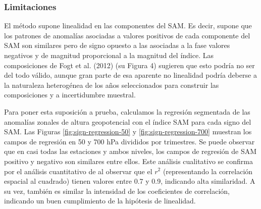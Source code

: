 \documentclass[12pt,oneside]{reedthesis}
\begin{document}
\hypertarget{limitaciones}{%
\subsubsection{Limitaciones}\label{limitaciones}}

El método supone linealidad en las componentes del SAM.
Es decir, supone que los patrones de anomalías asociadas a valores positivos de cada componente del SAM son similares pero de signo opuesto a las asociadas a la fase valores negativos y de magnitud proporcional a la magnitud del índice.
Las composiciones de Fogt et al. (2012) (su Figura 4) sugieren que esto podría no ser del todo válido, aunque gran parte de esa aparente no linealidad podría deberse a la naturaleza heterogénea de los años seleccionados para construir las composiciones y a incertidumbre muestral.

Para poner esta suposición a prueba, calculamos la regresión segmentada de las anomalías zonales de altura geopotencial con el índice SAM para cada signo del SAM.
Las Figuras \ref{fig:sign-regression-50} y \ref{fig:sign-regression-700} muestran los campos de regresión en 50 y 700 hPa divididos por trimestres.
Se puede observar que en casi todas las estaciones y ambos niveles, los campos de regresión de SAM positivo y negativo son similares entre ellos.
Este análisis cualitativo se confirma por el análisis cuantitativo de al observar que el \(r^2\) (representando la correlación espacial al cuadrado) tienen valores entre 0.7 y 0.9, indicando alta similaridad.
A su vez, también es similar la intensidad de los coeficientes de correlación, indicando un buen cumplimiento de la hipótesis de linealidad.
\end{document}
